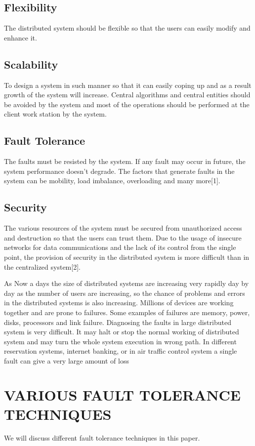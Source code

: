 \documentclass{article}
\begin{document}
\subsection{Flexibility}
The distributed system should be flexible so that the users can easily modify and enhance it.

\subsection{Scalability}
To design a system in such manner so that it can easily coping up and as a result growth of the system will increase. Central algorithms and central entities should be avoided by the system and most of the operations should be performed at the client work station by the system.

\subsection{Fault Tolerance}
The faults must be resisted by the system. If any fault may occur in future, the system performance doesn’t degrade. The factors that generate faults in the system can be mobility, load imbalance, overloading and many more[1].

\subsection{Security}
The various resources of the system must be secured from unauthorized access and destruction so that the users can trust them. Due to the usage of insecure networks for data communications and the lack of its control from the single point, the provision of security in the distributed system is more difficult than in the centralized system[2].

As Now a days the size of distributed systems are increasing very rapidly day by day as the number of users are increasing, so the chance of problems and errors in the distributed systems is also increasing. Millions of devices are working together and are prone to failures. Some examples of failures are memory, power, disks, processors and link failure. Diagnosing the faults in large distributed system is very difficult. It may halt or stop the normal working of distributed system and may turn the whole system execution in wrong path. In different reservation systems, internet banking, or in air traffic control system a single fault can give a very large amount of loss

\section{VARIOUS FAULT TOLERANCE \\ TECHNIQUES}
We will discuss different fault tolerance techniques in this paper.
\end{document}
